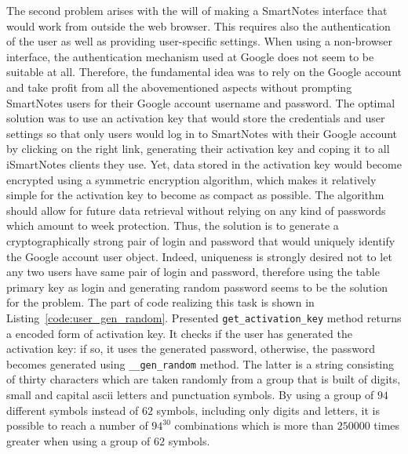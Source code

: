 \begin{itemize}
{The second problem arises with the will of making a SmartNotes interface that would work from outside the web browser. This requires also the authentication of the user as well as providing user-specific settings. When using a non-browser interface, the authentication mechanism used at Google does not seem to be suitable at all. Therefore, the fundamental idea was to rely on the Google account and take profit from all the abovementioned aspects without prompting SmartNotes users for their Google account username and password. The optimal solution was to use an activation key that would store the credentials and user settings so that only users would log in to SmartNotes with their Google account by clicking on the right link, generating their activation key and coping it to all iSmartNotes clients they use. Yet, data stored in the activation key would become encrypted using a symmetric encryption algorithm, which makes it relatively simple for the activation key to become as compact as possible. The algorithm should allow for future data retrieval without relying on any kind of passwords which amount to week protection. Thus, the solution is to generate a cryptographically strong pair of login and password that would uniquely identify the Google account user object.
Indeed, uniqueness is strongly desired not to let any two users have same pair of login and password, therefore using the table primary key as login and generating random password seems to be the solution for the problem. The part of code realizing this task is shown in Listing~\ref{code:user_gen_random}. Presented \texttt{get\_activation\_key} method returns a encoded form of activation key. It checks if the user has generated the activation key: if so, it uses the generated password, otherwise, the password becomes generated using \texttt{\_\_gen\_random} method. The latter is a string consisting of thirty characters which are taken randomly from a group that is built of digits, small and capital ascii letters and punctuation symbols. By using a group of $94$ different symbols instead of $62$ symbols, including only digits and letters, it is possible to reach a number of $94^{30}$ combinations which is more than $250000$ times greater when using a group of $62$ symbols.\\

}
\end{itemize}
